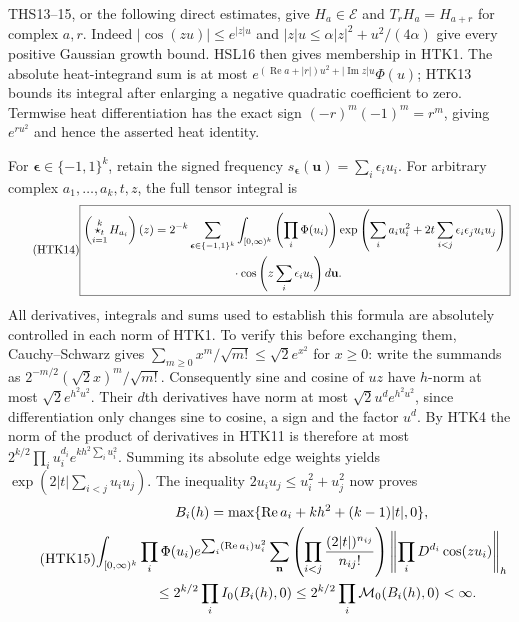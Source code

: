THS13--15, or the following direct estimates, give
$H_a\in\mathcal E$ and $T_rH_a=H_{a+r}$ for complex $a,r$.
Indeed $|\cos(zu)|\le e^{|z|u}$ and
$|z|u\le\alpha|z|^2+u^2/(4\alpha)$ give every positive
Gaussian growth bound. HSL16 then gives membership in HTK1.
The absolute heat-integrand sum is at most
$e^{(\operatorname{Re}a+|r|)u^2+|\operatorname{Im}z|u}\Phi(u)$;
HTK13 bounds its integral after enlarging a negative quadratic
coefficient to zero. Termwise heat differentiation has the
exact sign $(-r)^m(-1)^m=r^m$, giving $e^{ru^2}$ and hence
the asserted heat identity.

For $\boldsymbol\epsilon\in\{-1,1\}^k$, retain the signed
frequency
$s_{\boldsymbol\epsilon}(\mathbf u)=\sum_i\epsilon_i u_i$.
For arbitrary complex $a_1,\ldots,a_k,t,z$, the full tensor
integral is
\begin{equation}\tag{HTK14}
\boxed{\begin{aligned}
 \left(\mathop{\star_t}_{i=1}^kH_{a_i}\right)(z)
 =2^{-k}\sum_{\boldsymbol\epsilon\in\{-1,1\}^k}
 \int_{[0,\infty)^k}&\left(\prod_i\Phi(u_i)\right)
   \exp\left(\sum_i a_i u_i^2
        +2t\sum_{i<j}\epsilon_i\epsilon_j u_i u_j\right)\\
 &\hspace{-12mm}\cdot
                  \cos\left(z\sum_i\epsilon_i u_i\right)d\mathbf u.
\end{aligned}}
\end{equation}
All derivatives, integrals and sums used to establish this
formula are absolutely controlled in each norm of HTK1.
To verify this before exchanging them, Cauchy--Schwarz gives
$\sum_{m\ge0}x^m/\sqrt{m!}\le\sqrt2e^{x^2}$ for $x\ge0$:
write the summands as
$2^{-m/2}(\sqrt2x)^m/\sqrt{m!}$.
Consequently sine and cosine of $uz$ have $h$-norm at most
$\sqrt2e^{h^2u^2}$. Their $d$th derivatives have norm at
most $\sqrt2u^de^{h^2u^2}$, since differentiation only
changes sine to cosine, a sign and the factor $u^d$.
By HTK4 the norm of the product of derivatives in HTK11
is therefore at most
$2^{k/2}\prod_i u_i^{d_i}e^{kh^2\sum_i u_i^2}$.
Summing its absolute edge weights yields
$\exp(2|t|\sum_{i<j}u_iu_j)$.
The inequality $2u_iu_j\le u_i^2+u_j^2$ now proves
\begin{equation}\tag{HTK15}
\begin{gathered}
 B_i(h)=\max\{\operatorname{Re}a_i+kh^2+(k-1)|t|,0\},\\
 \int_{[0,\infty)^k}\prod_i\Phi(u_i)e^{\sum_i(\operatorname{Re}a_i)u_i^2}
 \sum_{\mathbf n}\left(\prod_{i<j}\frac{(2|t|)^{n_{ij}}}{n_{ij}!}\right)
       \left\|\prod_iD^{d_i}\cos(zu_i)\right\|_h\\
 \hspace{8mm}\le 2^{k/2}\prod_i I_0(B_i(h),0)
                  \le2^{k/2}\prod_i\mathcal M_0(B_i(h),0)<\infty.
\end{gathered}
\end{equation}
